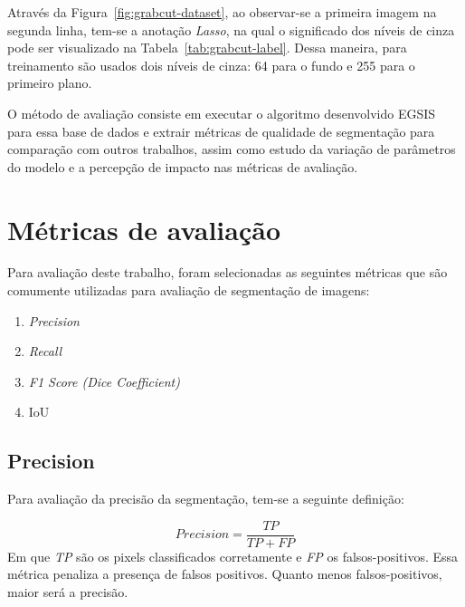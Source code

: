 Através da Figura~\ref{fig:grabcut-dataset}, ao observar-se a primeira
imagem na segunda linha, tem-se a anotação \textit{Lasso}, na qual o
significado dos níveis de cinza pode ser visualizado na
Tabela~\ref{tab:grabcut-label}. Dessa maneira, para
treinamento\footnotemark{} são usados dois níveis de cinza: 64 para o
fundo e 255 para o primeiro plano.


O método de avaliação consiste em executar o algoritmo desenvolvido
\gls{EGSIS} para essa base de dados e extrair métricas de qualidade de
segmentação para comparação com outros trabalhos, assim como estudo da
variação de parâmetros do modelo e a percepção de impacto nas métricas
de avaliação.

\section{Métricas de avaliação}\label{sec:metricas-avaliacao}

Para avaliação deste trabalho, foram selecionadas as seguintes métricas
que são comumente utilizadas para avaliação de segmentação de imagens:

\begin{enumerate}
\item \textit{Precision}
\item \textit{Recall}
\item \textit{F1 Score (Dice Coefficient)}
\item IoU
\end{enumerate}


\subsection{Precision}\label{sec:precision}

Para avaliação da precisão da segmentação, tem-se a seguinte definição:

\begin{equation}\label{eq:precision}
  Precision = \dfrac{TP}{TP + FP}
\end{equation}
\noindent
Em que \textit{TP} são os pixels classificados corretamente e \textit{FP}
os falsos-positivos. Essa métrica penaliza a presença de falsos
positivos. Quanto menos falsos-positivos, maior será a precisão.


